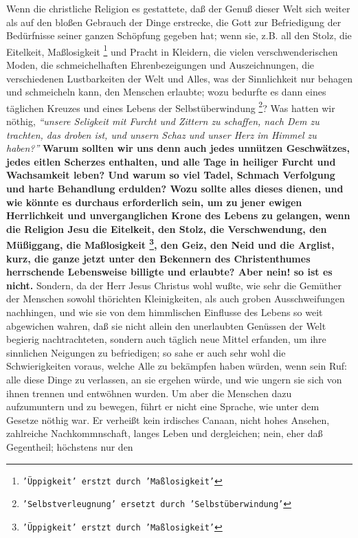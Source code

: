Wenn die christliche Religion es gestattete, daß der Genuß dieser Welt sich
weiter als auf den bloßen Gebrauch der Dinge erstrecke, die Gott zur
Befriedigung der Bedürfnisse seiner ganzen Schöpfung gegeben hat; wenn sie, z.B. all den Stolz, die Eitelkeit, Maßlosigkeit
\footnote{\texttt{'Üppigkeit' erstzt durch 'Maßlosigkeit'}}
und Pracht in Kleidern, die vielen
verschwenderischen Moden, die schmeichelhaften Ehrenbezeigungen und
Auszeichnungen, die verschiedenen Lustbarkeiten der Welt und Alles, was der
Sinnlichkeit nur behagen und schmeicheln kann, den Menschen erlaubte; wozu
bedurfte es dann eines täglichen Kreuzes und eines Lebens der Selbstüberwindung
\footnote{\texttt{'Selbstverleugnung' ersetzt durch 'Selbstüberwindung'}}?
Was hatten wir nöthig,
\textit{"`unsere Seligkeit mit Furcht und Zittern zu schaffen,
nach Dem zu trachten, das droben ist, und unsern Schaz und unser Herz im Himmel
zu haben?"'}
\textbf{Warum sollten wir uns denn auch jedes unnützen Geschwätzes, jedes
eitlen Scherzes enthalten, und alle Tage in heiliger Furcht und Wachsamkeit
leben? Und warum so viel Tadel, Schmach Verfolgung und harte Behandlung
erdulden? Wozu sollte alles dieses dienen, und wie könnte es durchaus
erforderlich sein, um zu jener ewigen Herrlichkeit und unverganglichen Krone
des Lebens zu gelangen, wenn die Religion Jesu die Eitelkeit, den Stolz, die
Verschwendung, den Müßiggang, die Maßlosigkeit
\footnote{\texttt{'Üppigkeit' erstzt durch 'Maßlosigkeit'}},
den Geiz, den Neid und die
Arglist, kurz, die ganze jetzt unter den Bekennern des Christenthumes
herrschende Lebensweise billigte und erlaubte? Aber nein! so ist es nicht.}
Sondern, da der Herr Jesus Christus wohl wußte, wie sehr die Gemüther der
Menschen sowohl thörichten Kleinigkeiten, als auch groben Ausschweifungen
nachhingen, und wie sie von dem himmlischen Einflusse des Lebens so weit
abgewichen wahren, daß sie nicht allein den unerlaubten Genüssen der Welt
begierig nachtrachteten, sondern auch täglich neue Mittel erfanden, um ihre
sinnlichen Neigungen zu befriedigen; so sahe er auch sehr wohl die
Schwierigkeiten voraus, welche Alle zu bekämpfen haben würden, wenn sein Ruf:
alle diese Dinge zu verlassen, an sie ergehen würde, und wie ungern sie sich von
ihnen trennen und entwöhnen wurden. Um aber die Menschen dazu aufzumuntern und
zu bewegen, führt er nicht eine Sprache, wie unter dem Gesetze nöthig war. Er
verheißt kein irdisches Canaan, nicht hohes Ansehen, zahlreiche Nachkommnschaft,
langes Leben und dergleichen; nein, eher daß Gegentheil; höchstens nur den
